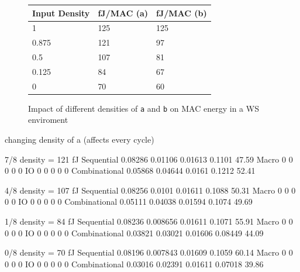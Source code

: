 \documentclass[sigconf]{acmart}
\begin{document}
\begin{figure}
\begin{tabular}{l l l}
  \textbf{Input Density} & \textbf{fJ/MAC (a)} & \textbf{fJ/MAC (b)} \\
  \toprule
  1 & 125 & 125 \\ \midrule
  0.875 & 121 & 97 \\ \midrule
  0.5 & 107 & 81 \\ \midrule
  0.125 & 84 & 67 \\ \midrule
  0 & 70 & 60 \\
  \bottomrule
\end{tabular}
\caption{Impact of different densities of \texttt{a} and \texttt{b} on MAC energy in a WS enviroment}
\label{fig:density_mac}
\end{figure}

\iffalse
changing density of a (affects every cycle)

7/8 density = 121 fJ
Sequential                     0.08286      0.01106       0.01613      0.1101       47.59
Macro                                0            0             0           0           0
IO                                   0            0             0           0           0
Combinational                  0.05868      0.04644        0.0161      0.1212       52.41

4/8 density = 107 fJ
Sequential                     0.08256       0.0101       0.01611      0.1088       50.31
Macro                                0            0             0           0           0
IO                                   0            0             0           0           0
Combinational                  0.05111      0.04038       0.01594      0.1074       49.69

1/8 density = 84 fJ
Sequential                     0.08236     0.008656       0.01611      0.1071       55.91
Macro                                0            0             0           0           0
IO                                   0            0             0           0           0
Combinational                  0.03821      0.03021       0.01606     0.08449       44.09

0/8 density = 70 fJ
Sequential                     0.08196     0.007843       0.01609      0.1059       60.14
Macro                                0            0             0           0           0
IO                                   0            0             0           0           0
Combinational                  0.03016      0.02391       0.01611     0.07018       39.86
\end{document}
